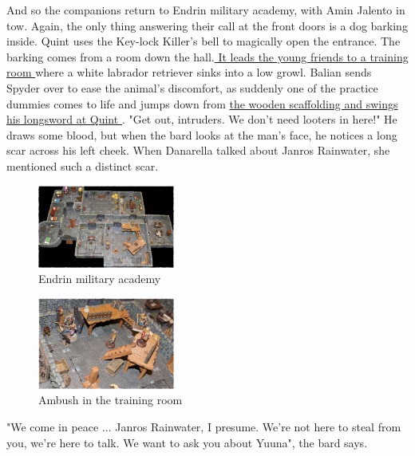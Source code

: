 And so the companions return to Endrin military academy, with Amin Jalento in tow. Again, the only thing answering their call at the front doors is a dog barking inside. Quint uses the Key-lock Killer's bell to magically open the entrance. The barking comes from a room down the hall.\hyperref[fig:Endrin-military-academy-550435227]{ It leads the young friends to a training room } where a white labrador retriever sinks into a low growl. Balian sends Spyder over to ease the animal's discomfort, as suddenly one of the practice dummies comes to life and jumps down from \hyperref[fig:Ambush-in-the-training-room-550436061]{ the wooden scaffolding and swings his longsword at Quint } . "Get out, intruders. We don't need looters in here!" He draws some blood, but when the bard looks at the man's face, he notices a long scar across his left cheek. When Danarella talked about Janros Rainwater, she mentioned such a distinct scar. \\

\begin{figure}[h]
	\centering
	\includegraphics[width=0.4\textwidth]{images/Endrin-military-academy-550435227_mod.jpg}
	\caption{Endrin military academy}
	\label{fig:Endrin-military-academy-550435227}
\end{figure}

\begin{figure}[h]
	\centering
	\includegraphics[width=0.4\textwidth]{images/Ambush-in-the-training-room-550436061_mod.jpg}
	\caption{Ambush in the training room}
	\label{fig:Ambush-in-the-training-room-550436061}
\end{figure}

"We come in peace ... Janros Rainwater, I presume. We're not here to steal from you, we're here to talk. We want to ask you about Yuuna", the bard says.\\

